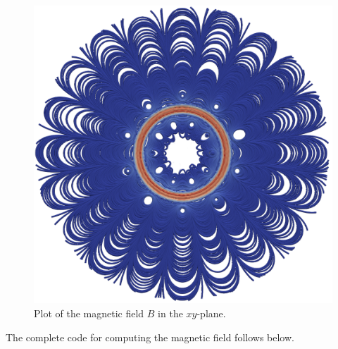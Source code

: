 \documentclass[graybox,envcountchap,sectrefs,final]{svmonodo}
\begin{document}
\begin{figure}[!ht]  %
  \centerline{\includegraphics[width=0.75\linewidth]{fig/magnetostatics_field.png}}
  \caption{
  Plot of the magnetic field $B$ in the $xy$-plane. \label{ftut1:fig:magnetostatics:field}
  }
\end{figure}


The complete code for computing the magnetic field follows below.
\end{document}
